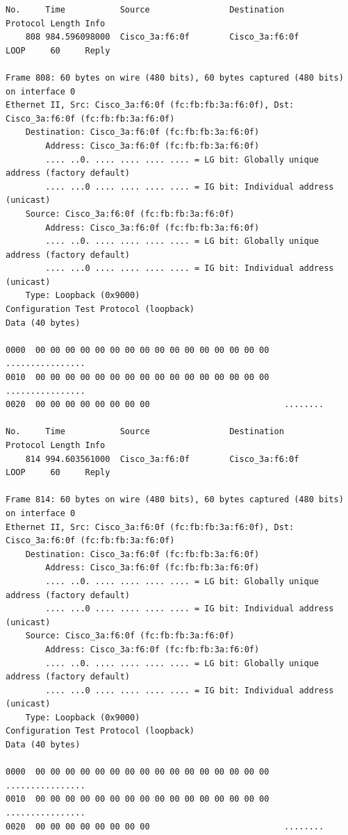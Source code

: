 \documentclass[a4paper,11pt]{article}
\begin{document}
\begin{lstlisting}
No.     Time           Source                Destination           Protocol Length Info
    808 984.596098000  Cisco_3a:f6:0f        Cisco_3a:f6:0f        LOOP     60     Reply

Frame 808: 60 bytes on wire (480 bits), 60 bytes captured (480 bits) on interface 0
Ethernet II, Src: Cisco_3a:f6:0f (fc:fb:fb:3a:f6:0f), Dst: Cisco_3a:f6:0f (fc:fb:fb:3a:f6:0f)
    Destination: Cisco_3a:f6:0f (fc:fb:fb:3a:f6:0f)
        Address: Cisco_3a:f6:0f (fc:fb:fb:3a:f6:0f)
        .... ..0. .... .... .... .... = LG bit: Globally unique address (factory default)
        .... ...0 .... .... .... .... = IG bit: Individual address (unicast)
    Source: Cisco_3a:f6:0f (fc:fb:fb:3a:f6:0f)
        Address: Cisco_3a:f6:0f (fc:fb:fb:3a:f6:0f)
        .... ..0. .... .... .... .... = LG bit: Globally unique address (factory default)
        .... ...0 .... .... .... .... = IG bit: Individual address (unicast)
    Type: Loopback (0x9000)
Configuration Test Protocol (loopback)
Data (40 bytes)

0000  00 00 00 00 00 00 00 00 00 00 00 00 00 00 00 00   ................
0010  00 00 00 00 00 00 00 00 00 00 00 00 00 00 00 00   ................
0020  00 00 00 00 00 00 00 00                           ........

No.     Time           Source                Destination           Protocol Length Info
    814 994.603561000  Cisco_3a:f6:0f        Cisco_3a:f6:0f        LOOP     60     Reply

Frame 814: 60 bytes on wire (480 bits), 60 bytes captured (480 bits) on interface 0
Ethernet II, Src: Cisco_3a:f6:0f (fc:fb:fb:3a:f6:0f), Dst: Cisco_3a:f6:0f (fc:fb:fb:3a:f6:0f)
    Destination: Cisco_3a:f6:0f (fc:fb:fb:3a:f6:0f)
        Address: Cisco_3a:f6:0f (fc:fb:fb:3a:f6:0f)
        .... ..0. .... .... .... .... = LG bit: Globally unique address (factory default)
        .... ...0 .... .... .... .... = IG bit: Individual address (unicast)
    Source: Cisco_3a:f6:0f (fc:fb:fb:3a:f6:0f)
        Address: Cisco_3a:f6:0f (fc:fb:fb:3a:f6:0f)
        .... ..0. .... .... .... .... = LG bit: Globally unique address (factory default)
        .... ...0 .... .... .... .... = IG bit: Individual address (unicast)
    Type: Loopback (0x9000)
Configuration Test Protocol (loopback)
Data (40 bytes)

0000  00 00 00 00 00 00 00 00 00 00 00 00 00 00 00 00   ................
0010  00 00 00 00 00 00 00 00 00 00 00 00 00 00 00 00   ................
0020  00 00 00 00 00 00 00 00                           ........


\end{lstlisting}
\end{document}
